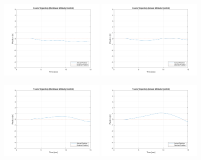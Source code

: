 \begin{figure}
    \centering
    \includegraphics[width=0.45\textwidth]{graphics/experiment_plots/yaw_minus_non_position_x.png}
    \includegraphics[width=0.45\textwidth]{graphics/experiment_plots/yaw_minus_pid_position_x.png}
    
    \includegraphics[width=0.45\textwidth]{graphics/experiment_plots/yaw_minus_non_position_y.png}
    \includegraphics[width=0.45\textwidth]{graphics/experiment_plots/yaw_minus_pid_position_y.png}
    

\end{figure}
